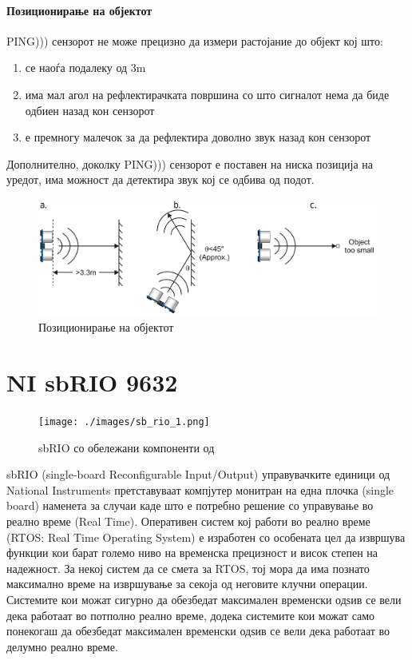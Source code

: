 \documentclass[12pt]{article}
\begin{document}
      \paragraph{Позиционирање на објектот\\}
        PING))) сензорот не може прецизно да измери растојание до објект кој што:

      \renewcommand{\theenumi}{\alph{enumi}}
      \begin{enumerate}
        \item се наоѓа подалеку од 3m
        \item има мал агол на рефлектирачката површина со што сигналот нема да биде одбиен назад кон сензорот
        \item е премногу малечок за да рефлектира доволно звук назад кон сензорот
        \end{enumerate}

		  Дополнително, доколку PING))) сензорот е поставен на ниска позиција на уредот, има можност да детектира звук кој се одбива од подот.

      \begin{figure}[H]
        \includegraphics[width=0.75\linewidth]{./images/ping_obj.png}
        \centering
        \caption{Позиционирање на објектот}
        \label{fig:ping_obj.png}
        \end{figure}

\newpage

\section{NI sbRIO 9632}
	\begin{figure}[h]
		\centering
		\texttt{[image: ./images/sb\_rio\_1.png]}
		\caption{sbRIO со обележани компоненти од \cite{experiments}}
		\label{fig:sb_rio_1.png}
		\end{figure}

  sbRIO (single-board Reconfigurable Input/Output) управувачките единици од National Instruments претставуваат компјутер монитран на една плочка (single board) наменета за случаи каде што е потребно решение со управување во реално време (Real Time). Оперативен систем кој работи во реално време (RTOS: Real Time Operating System) е изработен со особената цел да извршува функции кои барат големо ниво на временска прецизност и висок степен на надежност. За некој систем да се смета за RTOS, тој мора да има познато максимално време на извршување за секоја од неговите клучни операции. Системите кои можат сигурно да обезбедат максимален временски одѕив се вели дека работаат во потполно реално време, додека системите кои можат само понекогаш да обезбедат максимален временски одѕив се вели дека работаат во делумно реално време.
\end{document}
